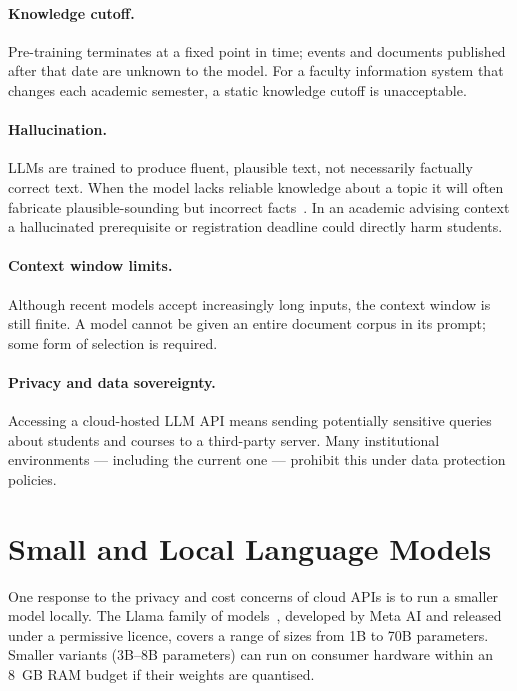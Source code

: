 \paragraph{Knowledge cutoff.} Pre-training terminates at a fixed point in time; events and documents published after that date are unknown to the model. For a faculty information system that changes each academic semester, a static knowledge cutoff is unacceptable.

\paragraph{Hallucination.} LLMs are trained to produce fluent, plausible text, not necessarily factually correct text. When the model lacks reliable knowledge about a topic it will often fabricate plausible-sounding but incorrect facts~\cite{lewis2020rag}. In an academic advising context a hallucinated prerequisite or registration deadline could directly harm students.

\paragraph{Context window limits.} Although recent models accept increasingly long inputs, the context window is still finite. A model cannot be given an entire document corpus in its prompt; some form of selection is required.

\paragraph{Privacy and data sovereignty.} Accessing a cloud-hosted LLM API means sending potentially sensitive queries about students and courses to a third-party server. Many institutional environments — including the current one — prohibit this under data protection policies.

\section{Small and Local Language Models}
\label{sec:bg-small}

One response to the privacy and cost concerns of cloud APIs is to run a smaller model locally. The Llama family of models~\cite{touvron2023llama2}, developed by Meta AI and released under a permissive licence, covers a range of sizes from 1B to 70B parameters. Smaller variants (3B--8B parameters) can run on consumer hardware within an 8~GB RAM budget if their weights are quantised.

